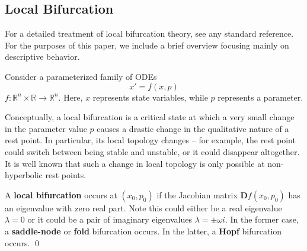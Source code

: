 \subsection{Local Bifurcation}

For a detailed treatment of local bifurcation theory, see any standard reference. For the purposes of this paper, we include a brief overview focusing mainly on descriptive behavior. 

Consider a parameterized family of ODEs
%
\begin{equation}
	x' = f(x, p)
\end{equation}
%
$f: \mathbb{R}^n \times \mathbb{R} \to \mathbb{R}^n$. Here, $x$ represents state variables, while $p$ represents a parameter. 

%

Conceptually, a local bifurcation is a critical state at which a very small change in the parameter value $p$ causes a drastic change in the qualitative nature of a rest point. In particular, its local topology changes -- for example, the rest point could switch between being stable and unstable, or it could disappear altogether. It is well known that such a change in local topology is only possible at non-hyperbolic rest points. 

\begin{definition}
	A \textbf{local bifurcation} occurs at ${\displaystyle (x_{0}, p_{0})}$ if the Jacobian matrix ${\displaystyle {\mathbf{D}f(x_{0},p _{0})}}$ has an eigenvalue with zero real part. Note this could either be a real eigenvalue $\lambda = 0$ or it could be a pair of imaginary eigenvalues $\lambda = \pm \omega i$. In the former case, a \textbf{saddle-node} or \textbf{fold} bifurcation occurs. In the latter, a \textbf{Hopf} bifurcation occurs. \qed
\end{definition}

